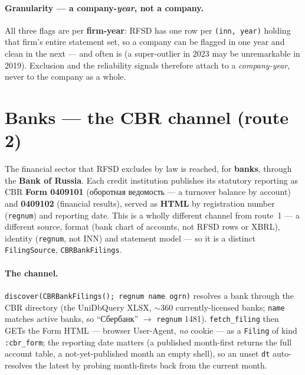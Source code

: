 \documentclass[11pt,a4paper]{report}
\newcommand{\rus}[1]{{\rusfont #1}}
\begin{document}
\paragraph{Granularity --- a company-\emph{year}, not a company.} All three flags are per \textbf{firm-year}:
RFSD has one row per \texttt{(inn, year)} holding that firm's entire statement set, so a company can be
flagged in one year and clean in the next --- and often is (a super-outlier in 2023 may be unremarkable in
2019). Exclusion and the reliability signals therefore attach to a \emph{company-year}, never to the company
as a whole.

\section{Banks --- the CBR channel (route 2)}\label{sec:russia-cbr}

The financial sector that RFSD excludes by law is reached, for \textbf{banks}, through the \textbf{Bank of
Russia}. Each credit institution publishes its statutory reporting as CBR \textbf{Form 0409101} (\rus{оборотная
ведомость} --- a turnover balance by account) and \textbf{0409102} (financial results), served as \textbf{HTML}
by registration number (\texttt{regnum}) and reporting date. This is a wholly different channel from route~1
--- a different source, format (bank chart of accounts, not RFSD rows or XBRL), identity (\texttt{regnum}, not
INN) and statement model --- so it is a distinct \texttt{FilingSource}, \texttt{CBRBankFilings}.

\paragraph{The channel.} \texttt{discover(CBRBankFilings(); regnum \textbar{} name \textbar{} ogrn)} resolves a
bank through the CBR directory (the UniDbQuery XLSX, $\sim$360 currently-licensed banks; \texttt{name} matches
active banks, so ``\rus{Сбербанк}'' $\to$ \texttt{regnum} 1481). \texttt{fetch\_filing} then GETs the Form
HTML --- browser User-Agent, \emph{no} cookie --- as a \texttt{Filing} of kind \texttt{:cbr\_form}; the
reporting date matters (a published month-first returns the full account table, a not-yet-published month an
empty shell), so an unset \texttt{dt} auto-resolves the latest by probing month-firsts back from the current
month.
\end{document}
